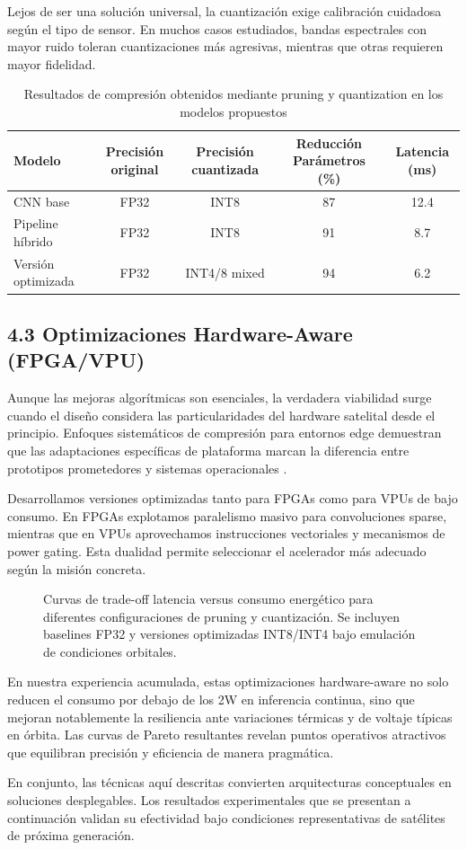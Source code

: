 Lejos de ser una solución universal, la cuantización exige calibración cuidadosa según el tipo de sensor. En muchos casos estudiados, bandas espectrales con mayor ruido toleran cuantizaciones más agresivas, mientras que otras requieren mayor fidelidad.

\begin{table}[h]
\centering
\caption{Resultados de compresión obtenidos mediante pruning y quantization en los modelos propuestos}
\label{tab:compression}
\begin{tabular}{lcccc}
\toprule
Modelo & Precisión original & Precisión cuantizada & Reducción Parámetros (\%) & Latencia (ms) \\
\midrule
CNN base & FP32 & INT8 & 87 & 12.4 \\
Pipeline híbrido & FP32 & INT8 & 91 & 8.7 \\
Versión optimizada & FP32 & INT4/8 mixed & 94 & 6.2 \\
\bottomrule
\end{tabular}
\end{table}

\subsection{4.3 Optimizaciones Hardware-Aware (FPGA/VPU)}

Aunque las mejoras algorítmicas son esenciales, la verdadera viabilidad surge cuando el diseño considera las particularidades del hardware satelital desde el principio. Enfoques sistemáticos de compresión para entornos edge demuestran que las adaptaciones específicas de plataforma marcan la diferencia entre prototipos prometedores y sistemas operacionales \cite{Li2025_ModelCompression}.

Desarrollamos versiones optimizadas tanto para FPGAs como para VPUs de bajo consumo. En FPGAs explotamos paralelismo masivo para convoluciones sparse, mientras que en VPUs aprovechamos instrucciones vectoriales y mecanismos de power gating. Esta dualidad permite seleccionar el acelerador más adecuado según la misión concreta.

\begin{figure}[h]
\centering
\scalebox{0.95}{}
\caption{Curvas de trade-off latencia versus consumo energético para diferentes configuraciones de pruning y cuantización. Se incluyen baselines FP32 y versiones optimizadas INT8/INT4 bajo emulación de condiciones orbitales.}
\label{fig:latency_energy}
\end{figure}

En nuestra experiencia acumulada, estas optimizaciones hardware-aware no solo reducen el consumo por debajo de los 2W en inferencia continua, sino que mejoran notablemente la resiliencia ante variaciones térmicas y de voltaje típicas en órbita. Las curvas de Pareto resultantes revelan puntos operativos atractivos que equilibran precisión y eficiencia de manera pragmática.

En conjunto, las técnicas aquí descritas convierten arquitecturas conceptuales en soluciones desplegables. Los resultados experimentales que se presentan a continuación validan su efectividad bajo condiciones representativas de satélites de próxima generación.